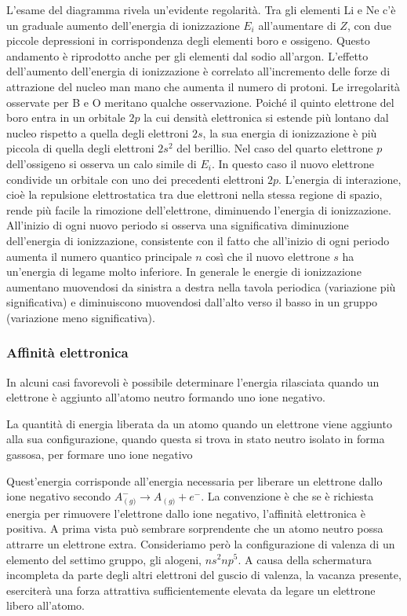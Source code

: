 L'esame del diagramma rivela un'evidente regolarità. Tra gli elementi Li e Ne c'è un graduale aumento dell'energia di ionizzazione $E_i$ all'aumentare di $Z$, con due piccole depressioni in corrispondenza degli elementi boro e ossigeno. Questo andamento è riprodotto anche per gli elementi dal sodio all'argon. L'effetto dell'aumento dell'energia di ionizzazione è correlato all'incremento delle forze di attrazione del nucleo man mano che aumenta il numero di protoni. Le irregolarità osservate per B e O meritano qualche osservazione. Poiché il quinto elettrone del boro entra in un orbitale $2p$ la cui densità elettronica si estende più lontano dal nucleo rispetto a quella degli elettroni $2s$, la sua energia di ionizzazione è più piccola di quella degli elettroni $2s^2$ del berillio. Nel caso del quarto elettrone $p$ dell'ossigeno si osserva un calo simile di $E_i$. In questo caso il nuovo elettrone condivide un orbitale con uno dei precedenti elettroni $2p$. L'energia di interazione, cioè la repulsione elettrostatica tra due elettroni nella stessa regione di spazio, rende più facile la rimozione dell'elettrone, diminuendo l'energia di ionizzazione. All'inizio di ogni nuovo periodo si osserva una significativa diminuzione dell'energia di ionizzazione, consistente con il fatto che all'inizio di ogni periodo aumenta il numero quantico principale $n$ così che il nuovo elettrone $s$ ha un'energia di legame molto inferiore. In generale le energie di ionizzazione aumentano muovendosi da sinistra a destra nella tavola periodica (variazione più significativa) e diminuiscono muovendosi dall'alto verso il basso in un gruppo (variazione meno significativa).
\subsubsection{Affinità elettronica}
In alcuni casi favorevoli è possibile determinare l'energia rilasciata quando un elettrone è aggiunto all'atomo neutro formando uno ione negativo. 
\begin{defn}
    La quantità di energia liberata da un atomo quando un elettrone viene aggiunto alla sua configurazione, quando questa si trova in stato neutro isolato in forma gassosa, per formare uno ione negativo
\end{defn}
Quest'energia corrisponde all'energia necessaria per liberare un elettrone dallo ione negativo secondo $A_{\left(g\right.)}^{-}\to A_{\left(g\right.)} + e^-$. La convenzione è che se è richiesta energia per rimuovere l'elettrone dallo ione negativo, l'affinità elettronica è positiva. A prima vista può sembrare sorprendente che un atomo neutro possa attrarre un elettrone extra. Consideriamo però la configurazione di valenza di un elemento del settimo gruppo, gli alogeni, $ns^2np^5$. A causa della schermatura incompleta da parte degli altri elettroni del guscio di valenza, la vacanza presente, eserciterà una forza attrattiva sufficientemente elevata da legare un elettrone libero all'atomo. 

